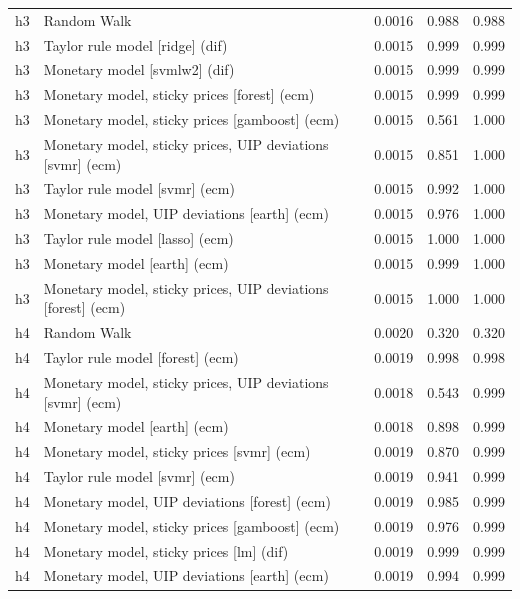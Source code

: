 \begin{ThreePartTable}
\begin{longtable}[t]{cp{5.5cm}ccc}
\addlinespace
h3 & \raggedright Random Walk & 0.0016 & 0.988 & 0.988\\
h3 & \raggedright Taylor rule model [ridge] (dif) & 0.0015 & 0.999 & 0.999\\
h3 & \raggedright Monetary model [svmlw2] (dif) & 0.0015 & 0.999 & 0.999\\
h3 & \raggedright Monetary model, sticky prices [forest] (ecm) & 0.0015 & 0.999 & 0.999\\
h3 & \raggedright Monetary model, sticky prices [gamboost] (ecm) & 0.0015 & 0.561 & 1.000\\
h3 & \raggedright Monetary model, sticky prices, UIP deviations [svmr] (ecm) & 0.0015 & 0.851 & 1.000\\
h3 & \raggedright Taylor rule model [svmr] (ecm) & 0.0015 & 0.992 & 1.000\\
h3 & \raggedright Monetary model, UIP deviations [earth] (ecm) & 0.0015 & 0.976 & 1.000\\
h3 & \raggedright Taylor rule model [lasso] (ecm) & 0.0015 & 1.000 & 1.000\\
h3 & \raggedright Monetary model [earth] (ecm) & 0.0015 & 0.999 & 1.000\\
h3 & \raggedright Monetary model, sticky prices, UIP deviations [forest] (ecm) & 0.0015 & 1.000 & 1.000\\
\addlinespace
h4 & \raggedright Random Walk & 0.0020 & 0.320 & 0.320\\
h4 & \raggedright Taylor rule model [forest] (ecm) & 0.0019 & 0.998 & 0.998\\
h4 & \raggedright Monetary model, sticky prices, UIP deviations [svmr] (ecm) & 0.0018 & 0.543 & 0.999\\
h4 & \raggedright Monetary model [earth] (ecm) & 0.0018 & 0.898 & 0.999\\
h4 & \raggedright Monetary model, sticky prices [svmr] (ecm) & 0.0019 & 0.870 & 0.999\\
h4 & \raggedright Taylor rule model [svmr] (ecm) & 0.0019 & 0.941 & 0.999\\
h4 & \raggedright Monetary model, UIP deviations [forest] (ecm) & 0.0019 & 0.985 & 0.999\\
h4 & \raggedright Monetary model, sticky prices [gamboost] (ecm) & 0.0019 & 0.976 & 0.999\\
h4 & \raggedright Monetary model, sticky prices [lm] (dif) & 0.0019 & 0.999 & 0.999\\
h4 & \raggedright Monetary model, UIP deviations [earth] (ecm) & 0.0019 & 0.994 & 0.999\\

\end{longtable}
\end{ThreePartTable}
